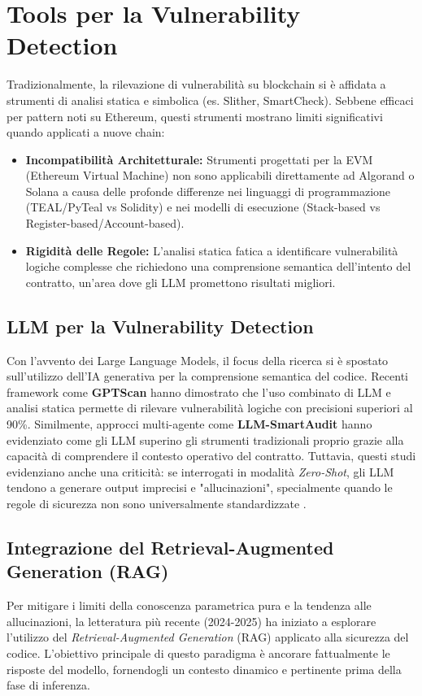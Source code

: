 \section{Tools per la Vulnerability Detection}
Tradizionalmente, la rilevazione di vulnerabilità su blockchain si è affidata a strumenti di analisi statica e simbolica (es. Slither, SmartCheck). Sebbene efficaci per pattern noti su Ethereum, questi strumenti mostrano limiti significativi quando applicati a nuove chain:
\begin{itemize}
    \item \textbf{Incompatibilità Architetturale:} Strumenti progettati per la EVM (Ethereum Virtual Machine) non sono applicabili direttamente ad Algorand o Solana a causa delle profonde differenze nei linguaggi di programmazione (TEAL/PyTeal vs Solidity) e nei modelli di esecuzione (Stack-based vs Register-based/Account-based).
    \item \textbf{Rigidità delle Regole:} L'analisi statica fatica a identificare vulnerabilità logiche complesse che richiedono una comprensione semantica dell'intento del contratto, un'area dove gli LLM promettono risultati migliori.
\end{itemize}

\subsection{LLM per la Vulnerability Detection}
Con l'avvento dei Large Language Models, il focus della ricerca si è spostato sull'utilizzo dell'IA generativa per la comprensione semantica del codice. 
Recenti framework come \textbf{GPTScan} \cite{sun2024gptscan} hanno dimostrato che l'uso combinato di LLM e analisi statica permette di rilevare vulnerabilità logiche con precisioni superiori al 90\%. 
Similmente, approcci multi-agente come \textbf{LLM-SmartAudit} \cite{llmsmartaudit2024} hanno evidenziato come gli LLM superino gli strumenti tradizionali proprio grazie alla capacità di comprendere il contesto operativo del contratto.
Tuttavia, questi studi evidenziano anche una criticità: se interrogati in modalità \textit{Zero-Shot}, gli LLM tendono a generare output imprecisi e "allucinazioni", specialmente quando le regole di sicurezza non sono universalmente standardizzate \cite{llm4vuln2024}.

\subsection{Integrazione del Retrieval-Augmented Generation (RAG)}
Per mitigare i limiti della conoscenza parametrica pura e la tendenza alle allucinazioni, la letteratura più recente (2024-2025) ha iniziato a esplorare l'utilizzo del \textit{Retrieval-Augmented Generation} (RAG) applicato alla sicurezza del codice. L'obiettivo principale di questo paradigma è ancorare fattualmente le risposte del modello, fornendogli un contesto dinamico e pertinente prima della fase di inferenza.

